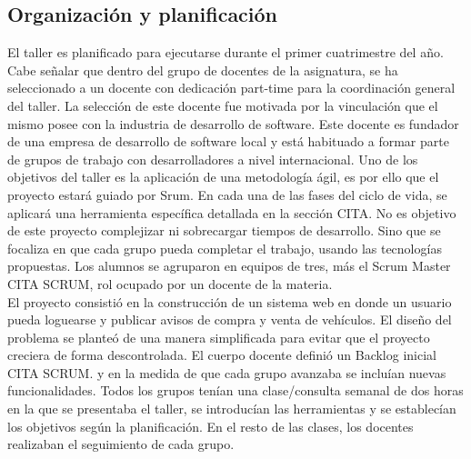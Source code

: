 \subsection{Organización y planificación}
El taller es planificado para ejecutarse durante el primer cuatrimestre del año. Cabe señalar
que dentro del grupo de docentes de la asignatura, se ha seleccionado a un docente  con dedicación part-time para la coordinación general 
del taller. La selección de este docente fue motivada por la vinculación que  el mismo posee con la industria de desarrollo de software. 
Este docente es fundador de una empresa de desarrollo de software local y está habituado a formar parte de grupos de trabajo
con desarrolladores a nivel internacional.
Uno de los objetivos del taller es la aplicación de una metodología ágil, es por ello que el proyecto estará guiado por Srum.
En cada una de las fases del ciclo de vida, se aplicará una herramienta específica detallada en la sección CITA. No es objetivo de este 
proyecto complejizar ni sobrecargar tiempos de desarrollo. Sino que se focaliza en que cada 
grupo pueda completar el trabajo, usando las tecnologías propuestas.  
Los alumnos se agruparon en equipos de tres, más el Scrum Master CITA SCRUM, rol ocupado por un docente de la materia.\\
El proyecto consistió en la construcción de un  sistema web en donde un usuario  pueda loguearse y publicar avisos de compra
 y venta de vehículos. El diseño del problema se planteó de una manera simplificada para evitar que el proyecto creciera de 
 forma descontrolada. El cuerpo docente definió un Backlog inicial CITA SCRUM. y en la medida de que cada grupo avanzaba se incluían 
 nuevas funcionalidades. Todos los grupos tenían una clase/consulta semanal de dos horas en la que se presentaba el taller,
 se introducían las herramientas y se establecían los objetivos según la planificación. En el resto de las clases, los docentes realizaban el seguimiento de cada grupo.
 

